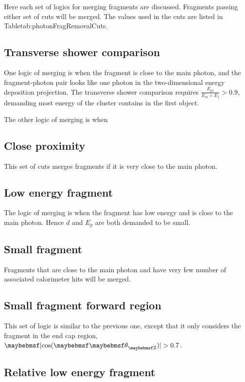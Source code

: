 Here each set of logics for merging fragments are discussed. Fragments passing either set of cuts will be merged. The values used in the cuts are listed in Table{tab:photonFragRemovalCuts}.

\subsection{Transverse shower comparison}

One logic of merging is when the fragment is close to the main photon, and the fragment-photon pair looks like one photon in the two-dimensional energy deposition projection. The transverse shower comparison requires $\frac{E_{p1}}{E_m + E_f} > 0.9 $, demanding  most energy of the cluster contains in the first \ShowerPeak object.

The other logic of merging is when

\subsection{Close proximity}

This set of cuts merges fragments if it is very close to the main photon.

\subsection{Low energy fragment}

The logic of merging  is when the fragment has low energy and is close to the main photon.  Hence $d$ and $E_p$ are both demanded to be small.

\subsection{Small fragment}

Fragments that are close to the main photon and have very few number of associated calorimeter hits will be merged.

\subsection{Small fragment forward region}

This set of logic is similar to the previous one, except that it only considers the fragment in the end cap region,  $\absCosTheta > 0.7$.

\subsection{Relative low energy fragment}


